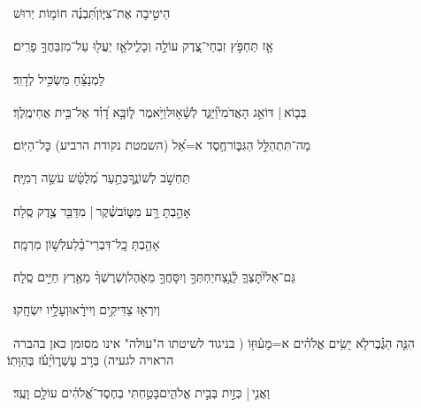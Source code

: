 \documentclass[12pt]{article}
\newcommand{\loc}[1]{\textsuperscript{\locf{#1}}}
\begin{document}
{\loc{ כ}~}‏הֵיטִ֣יבָה  אֶת־צִיּ֑וֹן{\hfill}תִּ֝בְנֶ֗ה חוֹמ֥וֹת יְרוּשׁ\par

{\loc{ כא}~}‏אָ֤ז תַּחְפֹּ֣ץ זִבְחֵי־צֶ֭דֶק עוֹלָ֣ה וְכָלִ֑יל{\hfill}אָ֤ז יַעֲל֖וּ עַל־מִזְבַּחֲךָ֣ פָרִֽים׃\par\pend
\ledpb
\pstart[\subsection*{\textcolor{red}{פרק נב}}]\label{פרק נב}
{\loc{ א}~}‏לַמְנַצֵּ֗חַ מַשְׂכִּ֥יל לְדָוִֽד׃\par

{\loc{ ב}~}‏בְּב֤וֹא |  דּוֹאֵ֣ג הָאֲדֹמִי֮{\hfill}וַיַּגֵּ֢ד לְשָׁ֫א֥וּל\newline\hspace*{.5em}וַיֹּ֥אמֶר ל֑וֹ{\hfill}בָּ֥א דָ֝וִ֗ד אֶל־בֵּ֥ית אֲחִימֶֽלֶךְ׃\par

{\loc{ ג}~}‏מַה־תִּתְהַלֵּ֣ל  הַגִּבּ֑וֹר{\hfill}חֶ֥סֶד א=אֵ֝ל (השמטת נקודת הרביע) כׇּל־הַיּֽוֹם׃\par

{\loc{ ד}~}‏ תַּחְשֹׁ֣ב לְשׁוֹנֶ֑ךָ{\hfill}כְּתַ֥עַר מְ֝לֻטָּ֗שׁ עֹשֵׂ֥ה רְמִיָּֽה׃\par

{\loc{ ה}~}‏אָהַ֣בְתָּ רָּ֣ע מִטּ֑וֹב{\hfill}שֶׁ֓קֶר |  מִדַּבֵּ֖ר צֶ֣דֶק סֶֽלָה׃\par

{\loc{ ו}~}‏אָהַ֥בְתָּ כׇֽל־דִּבְרֵי־בָ֗לַע{\hfill}לְשׁ֣וֹן מִרְמָֽה׃\par

{\loc{ ז}~}‏גַּם־אֵל֮{\hfill}יִתׇּצְךָ֢ לָ֫נֶ֥צַח\newline\hspace*{.5em}יַחְתְּךָ֣ וְיִסָּחֲךָ֣ מֵאֹ֑הֶל{\hfill}וְשֵׁרֶשְׁךָ֨ מֵאֶ֖רֶץ חַיִּ֣ים סֶֽלָה׃\par

{\loc{ ח}~}‏וְיִרְא֖וּ צַדִּיקִ֥ים וְיִירָ֗אוּ{\hfill}וְעָלָ֥יו יִשְׂחָֽקוּ׃\par

{\loc{ ט}~}‏הִנֵּ֤ה הַגֶּ֗בֶר{\hfill}לֹ֤א יָשִׂ֥ים אֱלֹהִ֗ים א=מָע֫וּזּ֥וֹ ( בניגוד לשיטתו ה"עולה" אינו מסומן כאן בהברה הראויה לגעיה)\newline\hspace*{.5em} בְּרֹ֣ב עׇשְׁר֑וֹ{\hfill}יָ֝עֹ֗ז בְּהַוָּתֽוֹ׃\par

{\loc{ י}~}‏וַאֲנִ֤י |  כְּזַ֣יִת  בְּבֵ֣ית אֱלֹהִ֑ים{\hfill}בָּטַ֥חְתִּי בְחֶסֶד־אֱ֝לֹהִ֗ים עוֹלָ֥ם וָעֶֽד׃\par
\end{document}

